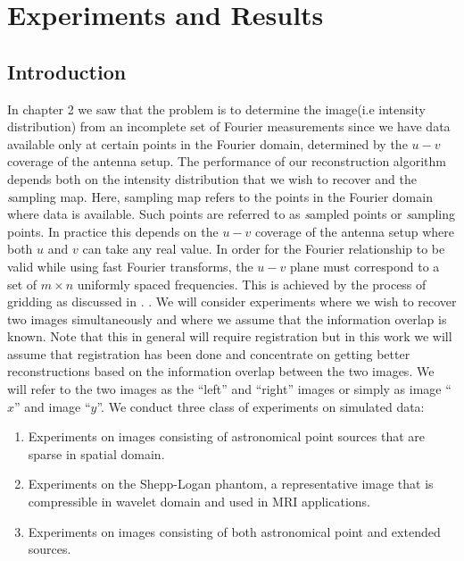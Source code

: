 \chapter{Experiments and Results}


\section{Introduction}

In chapter 2 we saw that the problem is to determine the image(i.e intensity distribution) from an incomplete set of Fourier measurements since we have data available only at certain points in the Fourier domain, determined by the $u-v$ coverage of the antenna setup. The performance of our reconstruction algorithm depends both on the intensity distribution that we wish to recover and the {\emph sampling map}. Here, sampling map refers to the points in the Fourier domain where data is available. Such points are referred to as {\emph sampled points} or {\emph sampling points}. In practice this depends on the $u-v$ coverage of the antenna setup where both $u$ and $v$ can take any real value. In order for the Fourier relationship to be valid while using fast Fourier transforms, the $u-v$ plane must correspond to a set of $m \times n$ uniformly spaced frequencies. This is achieved by the process of gridding as discussed in \cite{GMRT}. .
We will consider experiments where we wish to recover two images simultaneously and where we assume that the information overlap is known. Note that this in general will require registration but in this work we will assume that registration has been done and concentrate on getting better reconstructions based on the information overlap between the two images. We will refer to the two images as the ``left'' and ``right'' images or simply as image ``$x$'' and image ``$y$''. We conduct three class of experiments on simulated data:
\begin{enumerate}
 \item Experiments on images consisting of astronomical point sources that are sparse in spatial domain.
 \item Experiments on the Shepp-Logan phantom, a representative image that is compressible in wavelet domain and used in MRI applications.
  \item Experiments on images consisting of both astronomical point and extended sources.
\end{enumerate}

